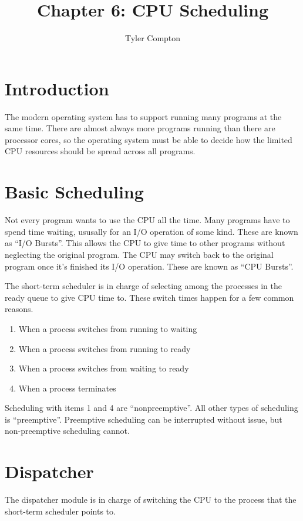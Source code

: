 \documentclass{article}
\author{Tyler Compton}
\title{Chapter 6: CPU Scheduling}
\begin{document}
\maketitle
\tableofcontents

\section{Introduction}
The modern operating system has to support running many programs at the same
time. There are almost always more programs running than there are processor
cores, so the operating system must be able to decide how the limited CPU
resources should be spread across all programs.

\section{Basic Scheduling}
Not every program wants to use the CPU all the time. Many programs have to
spend time waiting, ususally for an I/O operation of some kind. These are known
as ``I/O Bursts''. This allows the CPU to give time to other programs without
neglecting the original program. The CPU may switch back to the original
program once it's finished its I/O operation. These are known as
``CPU Bursts''.

The short-term scheduler is in charge of selecting among the processes in the
ready queue to give CPU time to. These switch times happen for a few common
reasons.

\begin{enumerate}
	\item When a process switches from running to waiting
	\item When a process switches from running to ready
	\item When a process switches from waiting to ready
	\item When a process terminates
\end{enumerate}

Scheduling with items 1 and 4 are ``nonpreemptive''. All other types of
scheduling is ``preemptive''. Preemptive scheduling can be interrupted without
issue, but non-preemptive scheduling cannot.

\section{Dispatcher}
The dispatcher module is in charge of switching the CPU to the process that the
short-term scheduler points to.
\end{document}
